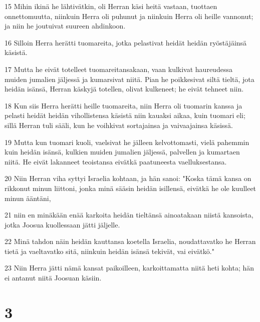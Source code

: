 \par 15 Mihin ikinä he lähtivätkin, oli Herran käsi heitä vastaan, tuottaen onnettomuutta, niinkuin Herra oli puhunut ja niinkuin Herra oli heille vannonut; ja niin he joutuivat suureen ahdinkoon.
\par 16 Silloin Herra herätti tuomareita, jotka pelastivat heidät heidän ryöstäjäinsä käsistä.
\par 17 Mutta he eivät totelleet tuomareitansakaan, vaan kulkivat haureudessa muiden jumalien jäljessä ja kumarsivat niitä. Pian he poikkesivat siltä tieltä, jota heidän isänsä, Herran käskyjä totellen, olivat kulkeneet; he eivät tehneet niin.
\par 18 Kun siis Herra herätti heille tuomareita, niin Herra oli tuomarin kanssa ja pelasti heidät heidän vihollistensa käsistä niin kauaksi aikaa, kuin tuomari eli; sillä Herran tuli sääli, kun he voihkivat sortajainsa ja vaivaajainsa käsissä.
\par 19 Mutta kun tuomari kuoli, vaelsivat he jälleen kelvottomasti, vielä pahemmin kuin heidän isänsä, kulkien muiden jumalien jäljessä, palvellen ja kumartaen niitä. He eivät lakanneet teoistansa eivätkä paatuneesta vaelluksestansa.
\par 20 Niin Herran viha syttyi Israelia kohtaan, ja hän sanoi: "Koska tämä kansa on rikkonut minun liittoni, jonka minä sääsin heidän isillensä, eivätkä he ole kuulleet minun ääntäni,
\par 21 niin en minäkään enää karkoita heidän tieltänsä ainoatakaan niistä kansoista, jotka Joosua kuollessaan jätti jäljelle.
\par 22 Minä tahdon näin heidän kauttansa koetella Israelia, noudattavatko he Herran tietä ja vaeltavatko sitä, niinkuin heidän isänsä tekivät, vai eivätkö."
\par 23 Niin Herra jätti nämä kansat paikoilleen, karkoittamatta niitä heti kohta; hän ei antanut niitä Joosuan käsiin.

\chapter{3}

